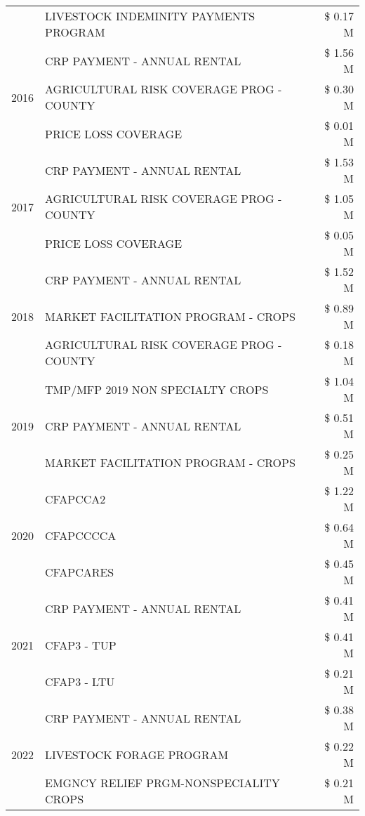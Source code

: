 \begin{tabular}{llr}
 & LIVESTOCK INDEMINITY PAYMENTS PROGRAM & \$ 0.17 M \\
\cline{1-3}
\multirow[t]{3}{*}{2016} & CRP PAYMENT - ANNUAL RENTAL & \$ 1.56 M \\
 & AGRICULTURAL RISK COVERAGE PROG - COUNTY & \$ 0.30 M \\
 & PRICE LOSS COVERAGE & \$ 0.01 M \\
\cline{1-3}
\multirow[t]{3}{*}{2017} & CRP PAYMENT - ANNUAL RENTAL & \$ 1.53 M \\
 & AGRICULTURAL RISK COVERAGE PROG - COUNTY & \$ 1.05 M \\
 & PRICE LOSS COVERAGE & \$ 0.05 M \\
\cline{1-3}
\multirow[t]{3}{*}{2018} & CRP PAYMENT - ANNUAL RENTAL & \$ 1.52 M \\
 & MARKET FACILITATION PROGRAM - CROPS & \$ 0.89 M \\
 & AGRICULTURAL RISK COVERAGE PROG - COUNTY & \$ 0.18 M \\
\cline{1-3}
\multirow[t]{3}{*}{2019} & TMP/MFP 2019 NON SPECIALTY CROPS & \$ 1.04 M \\
 & CRP PAYMENT - ANNUAL RENTAL & \$ 0.51 M \\
 & MARKET FACILITATION PROGRAM - CROPS & \$ 0.25 M \\
\cline{1-3}
\multirow[t]{3}{*}{2020} & CFAPCCA2 & \$ 1.22 M \\
 & CFAPCCCCA & \$ 0.64 M \\
 & CFAPCARES & \$ 0.45 M \\
\cline{1-3}
\multirow[t]{3}{*}{2021} & CRP PAYMENT - ANNUAL RENTAL & \$ 0.41 M \\
 & CFAP3 - TUP & \$ 0.41 M \\
 & CFAP3 - LTU & \$ 0.21 M \\
\cline{1-3}
\multirow[t]{3}{*}{2022} & CRP PAYMENT - ANNUAL RENTAL & \$ 0.38 M \\
 & LIVESTOCK FORAGE PROGRAM & \$ 0.22 M \\
 & EMGNCY RELIEF PRGM-NONSPECIALITY CROPS & \$ 0.21 M \\
\cline{1-3}
\bottomrule
\end{tabular}
